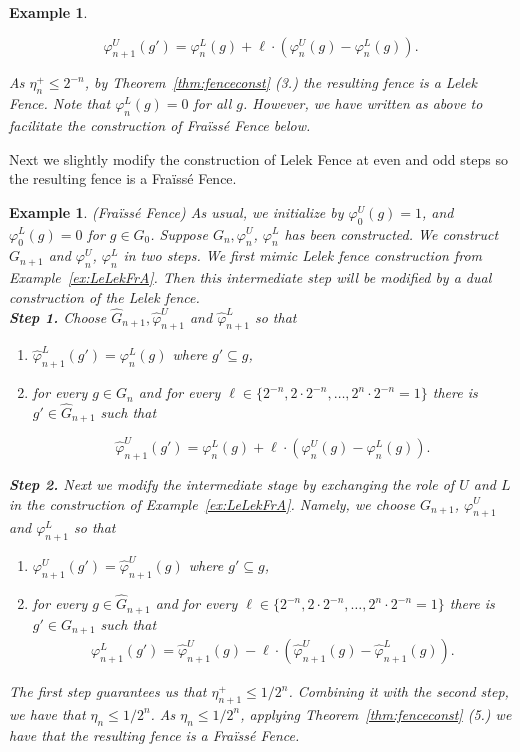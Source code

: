 \documentclass[11pt]{amsart}
\newtheorem{example}[theorem]{Example}
\begin{document}
{\begin{example}
\begin{enumerate}
    \[\varphi_{n+1}^U(g') = \varphi_n^L(g) + \ell \cdot (\varphi_{n}^U(g) - \varphi^L_n(g)).\]
    \end{enumerate}
   As $\eta^+_{n}\le 2^{-n}$,  by Theorem~\ref{thm:fenceconst} (3.) the resulting fence is a Lelek Fence. Note that $\varphi^L_n(g)=0$ for all $g$. However, we have written as above to facilitate the construction of Fra\"iss\'e Fence below.
\end{example}
Next we slightly modify the construction of Lelek Fence at even and odd steps so the resulting fence is a Fra\"iss\'e Fence.
\begin{example}\label{ex:FraisseFence}(Fra\"iss\'e Fence)
 As usual, we initialize by $\varphi^U_0(g)=1$, and $\varphi^L_0 (g)=0$ for $g \in G_0$.  Suppose $G_n, \varphi^U_n$, $\varphi^L_n$ has been constructed. We construct $G_{n+1}$ and $\varphi^U_n$, $\varphi^L_n$ in two steps. We first mimic Lelek fence construction from Example~\ref{ex:LeLekFrA}. Then this intermediate step will be modified by a dual construction of the Lelek fence.\\ %
{\bf Step 1.} Choose $\widehat{G}_{n+1}, \widehat{\varphi}^U_{n+1}$ and $\widehat{\varphi}^L_{n+1}$ so that 
 
 \begin{enumerate}
  \item $\widehat{\varphi}^L_{n+1} (g')= \varphi^L_{n}(g)$ where $g' \subseteq g$, 
    \item for every $g\in G_n$ and for every $\ell \in \{2^{-n}, 2\cdot 2^{-n},\ldots, 2^n\cdot 2^{-n}=1\}$ there is $g' \in \widehat{G}_{n+1}$ such that 
    
    \[\widehat{\varphi}_{n+1}^U(g') = \varphi_n^L(g) + \ell \cdot (\varphi_{n}^U(g) - \varphi^L_n(g)).\]
    \end{enumerate}
    {\bf Step 2.} Next we modify the intermediate stage  by exchanging the role of $U$ and $L$ in the  construction  of  Example~\ref{ex:LeLekFrA}.  Namely, we choose $G_{n+1}$, $\varphi^U_{n+1}$ and $\varphi^L_{n+1}$ so that
   \begin{enumerate}
  \item  $\varphi^U_{n+1} (g')= \widehat{\varphi}^U_{n+1}(g)$  where $g' \subseteq g$, 
    \item for every $g\in \widehat{G}_{n+1}$ and for every $\ell \in \{2^{-n}, 2\cdot 2^{-n},\ldots, 2^n\cdot 2^{-n}=1\}$ there is $g' \in G_{n+1}$ such that 
    \begin{align*}
    \varphi_{n+1}^L(g') = \widehat{\varphi}_{n+1}^U(g) - \ell \cdot (\widehat{\varphi}_{n+1}^U(g) - \widehat{\varphi}^L_{n+1}(g)).
        \end{align*}
    \end{enumerate}
    The first step guarantees us that $\eta^+_{n+1} \leq 1/2^n$. Combining it with the second step, we have that $\eta_n\leq 1/2^n$. As $\eta_n\leq 1/2^n$,
   applying Theorem~\ref{thm:fenceconst} (5.) we have that the resulting fence is a Fra\"iss\'e Fence. 
\end{example}

}
\end{document}
